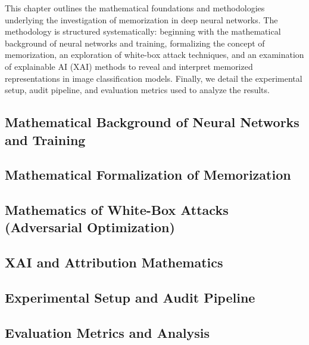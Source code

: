 This chapter outlines the mathematical foundations and methodologies 
underlying the investigation of memorization in deep neural networks. The methodology is structured systematically:
beginning with the mathematical background of neural networks and training, formalizing the concept of memorization, an exploration of white-box attack techniques, and an examination of explainable AI (XAI) methods to reveal and interpret memorized representations in image classification models. Finally, we detail the experimental setup, audit pipeline, and evaluation metrics used to analyze the results.


\subsection{Mathematical Background of Neural Networks and Training}

\subsection{Mathematical Formalization of Memorization}

\subsection{Mathematics of White-Box Attacks (Adversarial Optimization)}

\subsection{XAI and Attribution Mathematics}

\subsection{Experimental Setup and Audit Pipeline}

\subsection{Evaluation Metrics and Analysis}

